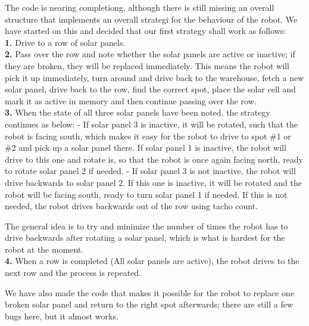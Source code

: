The code is nearing completiong, although there is still missing an
overall structure that implements an overall strategi for the behaviour
of the robot. We have started on this and decided that our first
strategy shall work as follows:
\\\textbf{1.} Drive to a row of solar
panels.
\\\textbf{2.} Pass over the row and note whether the solar panels
are active or inactive; if they are broken, they will be replaced
immediately. This means the robot will pick it up immediately, turn
around and drive back to the warehouse, fetch a new solar panel, drive
back to the row, find the correct spot, place the solar cell and mark it
as active in memory and then continue passing over the row.
\\\textbf{3.}
When the state of all three solar panels have been noted, the strategy
continues as below: - If solar panel 3 is inactive, it will be rotated,
such that the robot is facing south, which makes it easy for the robot
to drive to spot \#1 or \#2 and pick up a solar panel there. If solar
panel 1 is inactive, the robot will drive to this one and rotate is, so
that the robot is once again facing north, ready to rotate solar panel 2
if needed. - If solar panel 3 is not inactive, the robot will drive
backwards to solar panel 2. If this one is inactive, it will be rotated
and the robot will be facing south, ready to turn solar panel 1 if
needed. If this is not needed, the robot drives backwards out of the row
using tacho count.

The general idea is to try and minimize the number of times the robot
has to drive backwards after rotating a solar panel, which is what is
hardest for the robot at the moment.
\\\textbf{4.} When a row is completed (All solar panels are active), the
robot drives to the next row and the process is repeated.

We have also made the code that makes it possible for the robot to
replace one broken solar panel and return to the right spot afterwards;
there are still a few bugs here, but it almost works.
